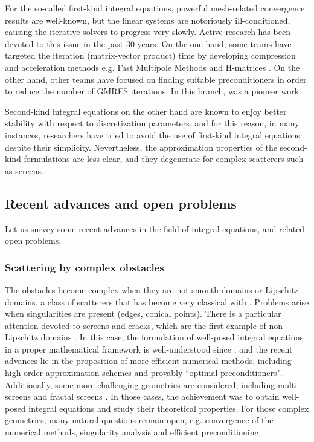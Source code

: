 \documentclass[]{article}
\begin{document}
For the so-called first-kind integral equations, powerful mesh-related convergence results are well-known, but the linear systems are notoriously ill-conditioned, causing the iterative solvers to progress very slowly. Active research has been devoted to this issue in the past 30 years. On the one hand, some teams have targeted the iteration (matrix-vector product) time by developing compression and acceleration methods e.g. Fast Multipole Methods \cite{greengard1987fast} and H-matrices \cite{hackbusch1999sparse}. On the other hand, other teams have focused on finding suitable preconditioners in order to reduce the number of GMRES iterations. In this branch, \cite{steinbach1998construction} was a pioneer work. 

Second-kind integral equations on the other hand are known to enjoy better stability with respect to discretization parameters, and for this reason, in many instances, researchers have tried to avoid the use of first-kind integral equations despite their simplicity. Nevertheless, the approximation properties of the second-kind formulations are less clear, and they degenerate for complex scatterers such as screens. 


\subsection*{Recent advances and open problems}

Let us survey some recent advances in the field of integral equations, and related open problems.

\subsubsection*{Scattering by complex obstacles}

The obstacles become complex when they are not smooth domains or Lipschitz domains, a class of scatterers that has become very classical with \cite{mclean2000strongly}. Problems arise when singularities are present (edges, conical points). There is a particular attention devoted to screens and cracks, which are the first example of non-Lipschitz domains \cite{bruno2013high,gimperlein2019optimal,hiptmair2018closed,hiptmair2019preconditioning,hiptmair2020optimal,hiptmair2020compact,ramaciotti2017some}. In this case, the formulation of well-posed integral equations in a proper mathematical framework is well-understood since \cite{stephan1984augmented,wendland1990hypersingular}, and the recent advances lie in the proposition of more efficient numerical methods, including high-order approximation schemes and provably ``optimal preconditioners". Additionally, some more challenging geometries are considered, including multi-screens \cite{claeys2013integral,claeys2020quotient} and fractal screens \cite{chandlerWilde2017sobolev}. In those cases, the achievement was to obtain well-posed integral equations and study their theoretical properties. For those complex geometries, many natural questions remain open, e.g. convergence of the numerical methods, singularity analysis and efficient preconditioning. 
\end{document}
